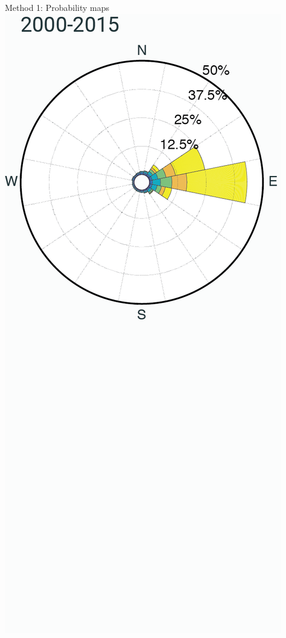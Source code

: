 \documentclass[10pt,aspectratio=169]{beamer}
\begin{document}
\begin{frame}{Method 1: Probability maps}
{    \includegraphics[width=.25\textwidth]{img/wind_all.png}
  }
\end{frame}
\end{document}
